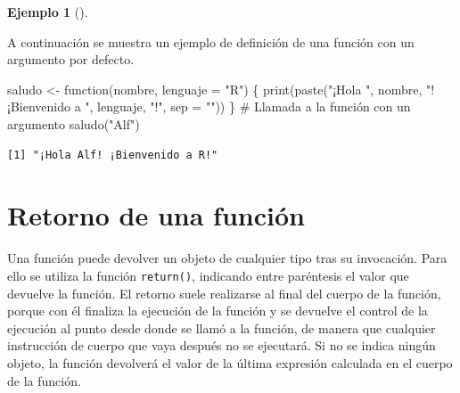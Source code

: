 \documentclass[
  a4paper,
]{scrreport}
\newenvironment{Shaded}{\begin{snugshade}}{\end{snugshade}}
\newcommand{\AttributeTok}[1]{\textcolor[rgb]{0.40,0.45,0.13}{#1}}
\newcommand{\CommentTok}[1]{\textcolor[rgb]{0.37,0.37,0.37}{#1}}
\newcommand{\ControlFlowTok}[1]{\textcolor[rgb]{0.00,0.23,0.31}{#1}}
\newcommand{\FunctionTok}[1]{\textcolor[rgb]{0.28,0.35,0.67}{#1}}
\newcommand{\NormalTok}[1]{\textcolor[rgb]{0.00,0.23,0.31}{#1}}
\newcommand{\OtherTok}[1]{\textcolor[rgb]{0.00,0.23,0.31}{#1}}
\newcommand{\StringTok}[1]{\textcolor[rgb]{0.13,0.47,0.30}{#1}}
\theoremstyle{definition}
\theoremstyle{definition}
\newtheorem{example}{Ejemplo}[chapter]
\theoremstyle{remark}
\begin{document}
\leavevmode{}%
\begin{example}[]\label{exm-argumento-defecto-funcion}

A continuación se muestra un ejemplo de definición de una función con un
argumento por defecto.

\begin{Shaded}
\begin{Highlighting}[]
\NormalTok{saludo }\OtherTok{\textless{}{-}} \ControlFlowTok{function}\NormalTok{(nombre, }\AttributeTok{lenguaje =} \StringTok{"R"}\NormalTok{) \{}
  \FunctionTok{print}\NormalTok{(}\FunctionTok{paste}\NormalTok{(}\StringTok{"¡Hola "}\NormalTok{, nombre, }\StringTok{"! ¡Bienvenido a "}\NormalTok{, lenguaje, }\StringTok{"!"}\NormalTok{, }\AttributeTok{sep =} \StringTok{""}\NormalTok{))}
\NormalTok{\}}
\CommentTok{\# Llamada a la función con un argumento}
\FunctionTok{saludo}\NormalTok{(}\StringTok{"Alf"}\NormalTok{)}
\end{Highlighting}
\end{Shaded}

\begin{verbatim}
[1] "¡Hola Alf! ¡Bienvenido a R!"
\end{verbatim}

\end{example}

\hypertarget{retorno-de-una-funciuxf3n}{%
\section{Retorno de una función}\label{retorno-de-una-funciuxf3n}}

Una función puede devolver un objeto de cualquier tipo tras su
invocación. Para ello se utiliza la función \texttt{return()}, indicando
entre paréntesis el valor que devuelve la función. El retorno suele
realizarse al final del cuerpo de la función, porque con él finaliza la
ejecución de la función y se devuelve el control de la ejecución al
punto desde donde se llamó a la función, de manera que cualquier
instrucción de cuerpo que vaya después no se ejecutará. Si no se indica
ningún objeto, la función devolverá el valor de la última expresión
calculada en el cuerpo de la función.
\end{document}
